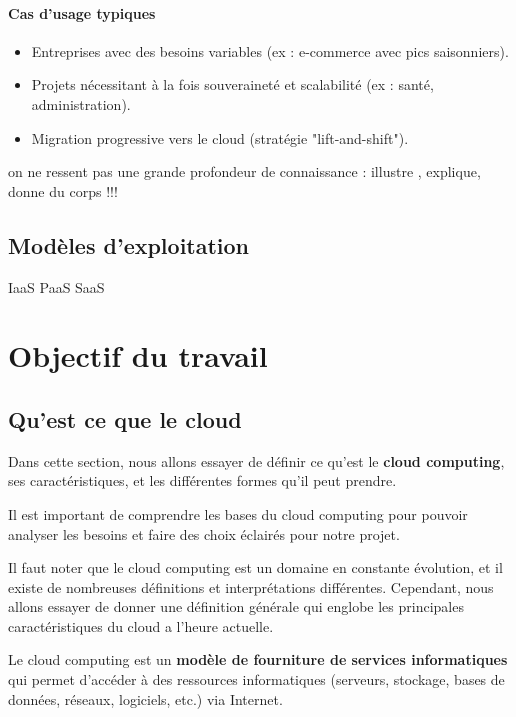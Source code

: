 \documentclass{rapportClass} %
\begin{document}
\subsubsection{Cas d’usage typiques}
\begin{itemize}
    \item Entreprises avec des besoins variables (ex : e-commerce avec pics saisonniers).
    \item Projets nécessitant à la fois souveraineté et scalabilité (ex : santé, administration).
    \item Migration progressive vers le cloud (stratégie "lift-and-shift").
\end{itemize}


{\color{red} on ne ressent pas une grande profondeur de connaissance : illustre , explique, donne du corps !!!}

{\color{red} 
\section{Modèles d'exploitation}

IaaS
PaaS
SaaS
}



\chapter{Objectif du travail}




\section{Qu'est ce que le cloud}

Dans cette section, nous allons essayer de définir ce qu'est le
\textbf{cloud computing}, ses caractéristiques, et les différentes
formes qu'il peut prendre.

Il est important de comprendre les bases du cloud computing pour
pouvoir analyser les besoins et faire des choix éclairés pour notre
projet.

Il faut noter que le cloud computing est un domaine en constante
évolution, et il existe de nombreuses définitions et interprétations
différentes. Cependant, nous allons essayer de donner une définition
générale qui englobe les principales caractéristiques du cloud a
l'heure actuelle.

Le cloud computing est un \textbf{modèle de fourniture de services
  informatiques} qui permet d'accéder à des ressources informatiques
(serveurs, stockage, bases de données, réseaux, logiciels, etc.) via
Internet.
\end{document}
